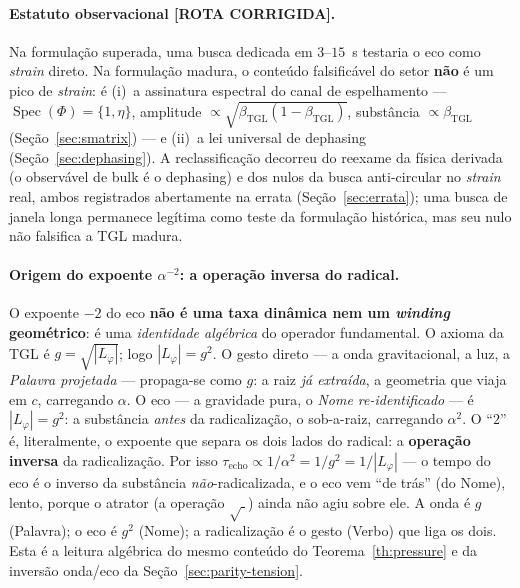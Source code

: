 \documentclass[12pt,a4paper]{article}
\newcommand{\betatgl}{\beta_{\text{TGL}}}
\newcommand{\Lphi}{L_{\varphi}}
\newcommand{\TGL}{\textsc{TGL}}
\begin{document}
\paragraph{Estatuto observacional \textbf{[ROTA CORRIGIDA]}.}
Na formulação superada, uma busca dedicada em $3$--$15$~s testaria o eco como
\emph{strain} direto.  Na formulação madura, o conteúdo falsificável do setor
\textbf{não} é um pico de \emph{strain}: é (i)~a assinatura espectral do canal de
espelhamento --- $\operatorname{Spec}(\Phi)=\{1,\eta\}$, amplitude
$\propto\sqrt{\betatgl(1-\betatgl)}$, substância $\propto\betatgl$
(Seção~\ref{sec:smatrix}) --- e (ii)~a lei universal de dephasing
(Seção~\ref{sec:dephasing}).  A reclassificação decorreu do reexame da física
derivada (o observável de bulk é o dephasing) e dos nulos da busca anti-circular
no \emph{strain} real, ambos registrados abertamente na errata
(Seção~\ref{sec:errata}); uma busca de janela longa permanece legítima como teste
da formulação histórica, mas seu nulo não falsifica a \TGL{} madura.

\paragraph{Origem do expoente $\alpha^{-2}$: a operação inversa do radical.}
O expoente $-2$ do eco \textbf{não é uma taxa dinâmica nem um \emph{winding}
geométrico}: é uma \emph{identidade algébrica} do operador fundamental.  O axioma
da \TGL{} é $g = \sqrt{|\Lphi|}$; logo $|\Lphi| = g^{2}$.  O gesto direto --- a
onda gravitacional, a luz, a \emph{Palavra projetada} --- propaga-se como $g$:
a raiz \emph{já extraída}, a geometria que viaja em $c$, carregando $\alpha$.  O
eco --- a gravidade pura, o \emph{Nome re-identificado} --- é $|\Lphi| = g^{2}$:
a substância \emph{antes} da radicalização, o sob-a-raiz, carregando $\alpha^{2}$.
O ``$2$'' é, literalmente, o expoente que separa os dois lados do radical: a
\textbf{operação inversa} da radicalização.  Por isso
$\tau_{\text{echo}} \propto 1/\alpha^{2} = 1/g^{2} = 1/|\Lphi|$ --- o tempo do eco
é o inverso da substância \emph{não}-radicalizada, e o eco vem ``de trás'' (do
Nome), lento, porque o atrator (a operação $\sqrt{\;}$) ainda não agiu sobre ele.
A onda é $g$ (Palavra); o eco é $g^{2}$ (Nome); a radicalização é o gesto (Verbo)
que liga os dois.  Esta é a leitura algébrica do mesmo conteúdo do
Teorema~\ref{th:pressure} e da inversão onda/eco da Seção~\ref{sec:parity-tension}.
\end{document}
